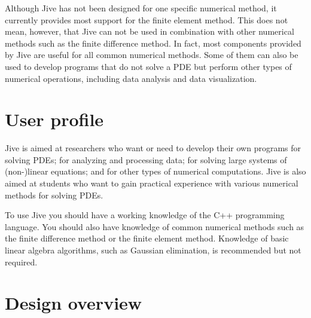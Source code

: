 Although Jive has not been designed for one specific numerical method, it
currently provides most support for the finite element method. This does
not mean, however, that Jive can not be used in combination with other
numerical methods such as the finite difference method. In fact, most
components provided by Jive are useful for all common numerical methods.
Some of them can also be used to develop programs that do not solve a PDE
but perform other types of numerical operations, including data analysis
and data visualization.


\section{User profile}

Jive is aimed at researchers who want or need to develop their own
programs for solving PDEs; for analyzing and processing data; for solving
large systems of (non-)linear equations; and for other types of numerical
computations. Jive is also aimed at students who want to gain practical
experience with various numerical methods for solving PDEs.

To use Jive you should have a working knowledge of the C++ programming
language. You should also have knowledge of common numerical methods such
as the finite difference method or the finite element method. Knowledge
of basic linear algebra algorithms, such as Gaussian elimination, is
recommended but not required.


\section{Design overview}

